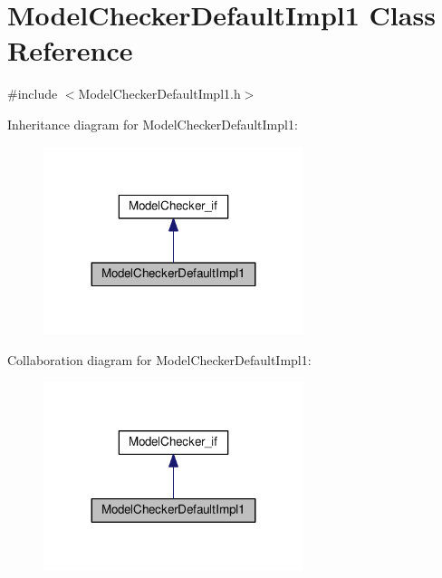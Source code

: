 \hypertarget{class_model_checker_default_impl1}{}\section{Model\+Checker\+Default\+Impl1 Class Reference}
\label{class_model_checker_default_impl1}


{\ttfamily \#include $<$Model\+Checker\+Default\+Impl1.\+h$>$}



Inheritance diagram for Model\+Checker\+Default\+Impl1\+:\nopagebreak
\begin{figure}[H]
\begin{center}
\leavevmode
\includegraphics[width=215pt]{class_model_checker_default_impl1__inherit__graph}
\end{center}
\end{figure}


Collaboration diagram for Model\+Checker\+Default\+Impl1\+:\nopagebreak
\begin{figure}[H]
\begin{center}
\leavevmode
\includegraphics[width=215pt]{class_model_checker_default_impl1__coll__graph}
\end{center}
\end{figure}
